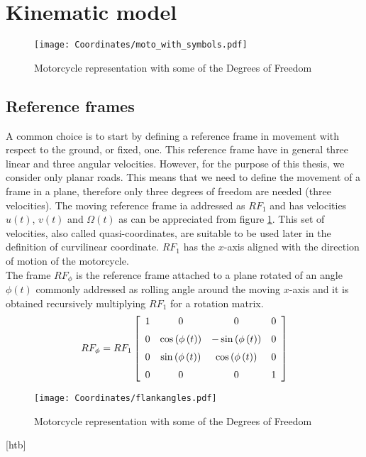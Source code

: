 \section{Kinematic model}
%
\begin{figure}[htb]
    \centering
    \texttt{[image: Coordinates/moto\_with\_symbols.pdf]}
    \caption{Motorcycle representation with some of the Degrees of Freedom}
    \label{fig:MotoLean}
\end{figure}
%
\subsection{Reference frames}
%
A common choice is to start by defining a reference frame in movement with respect to the ground, or fixed, one. This reference frame have in general three linear and three angular velocities. However, for the purpose of this thesis, we consider only planar roads. This means that we need to define the movement of a frame in a plane, therefore only three degrees of freedom are needed (three velocities). The moving reference frame ia addressed as $RF_1$ and has velocities $u(t)$, $v(t)$ and $\Omega(t)$ as can be appreciated from figure \ref{fig:MotoLean}. This set of velocities, also called quasi-coordinates, are suitable to be used later in the definition of curvilinear coordinate. $RF_1$ has the $x$-axis aligned with the direction of motion of the motorcycle. \\
The frame $RF_\phi$ is the reference frame attached to a plane rotated of an angle $\phi(t)$ commonly addressed as rolling angle around the moving $x$-axis and it is obtained recursively multiplying $RF_1$ for a rotation matrix.
%
\begin{equation}
    RF_\phi = RF_1 
    \left[ \begin {array}{cccc} 1&0&0&0\\ \noalign{\medskip}0&\cos
    \left( \phi \left( t \right)  \right) &-\sin \left( \phi \left( t
    \right)  \right) &0\\ \noalign{\medskip}0&\sin \left( \phi \left( t
    \right)  \right) &\cos \left( \phi \left( t \right)  \right) &0
   \\ \noalign{\medskip}0&0&0&1\end {array} \right]   
\end{equation}
%
%
\begin{figure}[htb]
    \centering
    \texttt{[image: Coordinates/flankangles.pdf]}
    \caption{Motorcycle representation with some of the Degrees of Freedom}
    \label{fig:MotoFlank}
\end{figure}[htb]
